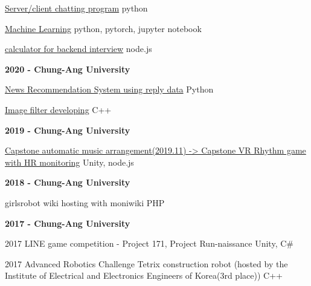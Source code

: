 \documentclass[letterpaper,MMMyyyy,nonstopmode]{simpleresumecv}
\begin{document}
\begin{Body}
\begin{Detail}
\BulletItem
\href{https://github.com/v1r4m/goodbye/blob/main/2021.md#20218}
{Server/client chatting program}
\SubBulletItem
{python}
\hfill
{}

\BulletItem
\href{https://github.com/v1r4m/MLmd}
{Machine Learning}
\SubBulletItem
{python, pytorch, jupyter notebook}
\hfill
{}

\BulletItem
\href{https://github.com/v1r4m/cal}
{calculator for backend interview}
\SubBulletItem
{node.js}
\hfill
{}

  
\BigGap
{\textbf{2020 - Chung-Ang University}}

 
\BulletItem
\href{https://github.com/kevinOriginal/news-recommender}
{News Recommendation System using reply data}
\SubBulletItem
{Python}
\hfill
{}

\BulletItem
\href{https://github.com/v1r4m/DIP}
{Image filter developing}
\SubBulletItem
{C++}
\hfill
{}


  

\BigGap
{\textbf{2019 - Chung-Ang University}}


\BulletItem
\href{https://github.com/v1r4m/VRfit}
{Capstone automatic music arrangement(2019.11) -> Capstone VR Rhythm game with HR monitoring}
\SubBulletItem
{Unity, node.js}
\hfill
{}

  
\BigGap
{\textbf{2018 - Chung-Ang University}}

 
\BulletItem
{girlsrobot wiki hosting with moniwiki}
\SubBulletItem
{PHP}
\hfill
{}


  
\BigGap
{\textbf{2017 - Chung-Ang University}}

 


\BulletItem
{2017 LINE game competition - Project 171, Project Run-naissance}
\SubBulletItem
{Unity, C\#}
\hfill
{}

\BulletItem
{2017 Advanced Robotics Challenge Tetrix construction robot (hosted by the Institute of Electrical and Electronics Engineers of Korea(3rd place))}
\SubBulletItem
{C++}
\hfill
{}


\end{Detail}
\end{Body}
\end{document}
